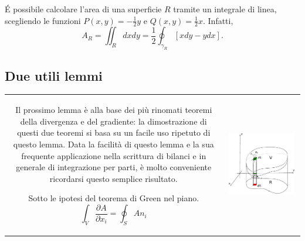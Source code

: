 \begin{example}
 \'E possibile calcolare l'area di una superficie $R$ tramite un integrale di linea,
 scegliendo le funzioni $P(x,y)=-\frac{1}{2}y$ e $Q(x,y)=\frac{1}{2}x$. Infatti, 
\begin{equation}
 A_R = \iint_R dx dy = \dfrac{1}{2} \oint_{\gamma_R} \left[x dy-y dx \right] .
\end{equation}
\end{example}

\subsection{Due utili lemmi}

\begin{tabular}{cc}
\begin{minipage}{0.6\textwidth}
Il prossimo lemma è alla base dei più rinomati teoremi della divergenza e del gradiente:
 la dimostrazione di questi due teoremi si basa su un facile uso ripetuto di questo lemma.
 Data la facilità di questo lemma e la sua frequente applicazione nella scrittura di bilanci e
 in generale di integrazione per parti, è molto conveniente ricordarsi questo semplice risultato.
\begin{lemma}\label{lemma:stokes:1} Sotto le ipotesi del teorema di Green nel piano.
\begin{equation}
  \int_V \frac{\partial A}{\partial x_i} = \oint_S A n_i
\end{equation}
\end{lemma}
\end{minipage}
&
\begin{minipage}{0.4\textwidth}
\begin{center}
\includegraphics[width=0.95\textwidth]{./fig/Div}
\end{center}
\end{minipage}
\end{tabular}
